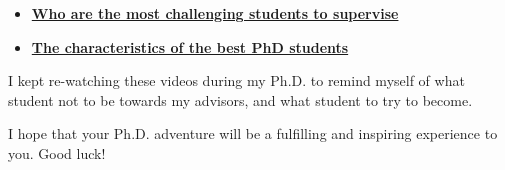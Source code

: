 \documentclass[10pt,twocolumn]{article}
\begin{document}
\begin{itemize}
\item \href{https://www.youtube.com/watch?v=WNzwwTYysTU}{\textcolor{deepblue}{\textbf{Who are the most challenging students to supervise}}}
\item \href{https://www.youtube.com/watch?v=WokV1JYgqZo}{\textcolor{deepblue}{\textbf{The characteristics of the best PhD students}}}
\end{itemize}

I kept re-watching these videos during my Ph.D. to remind myself of what student not to be towards my advisors, and what student to try to become.

I hope that your Ph.D. adventure will be a fulfilling and inspiring experience to you. Good luck!
\end{document}
